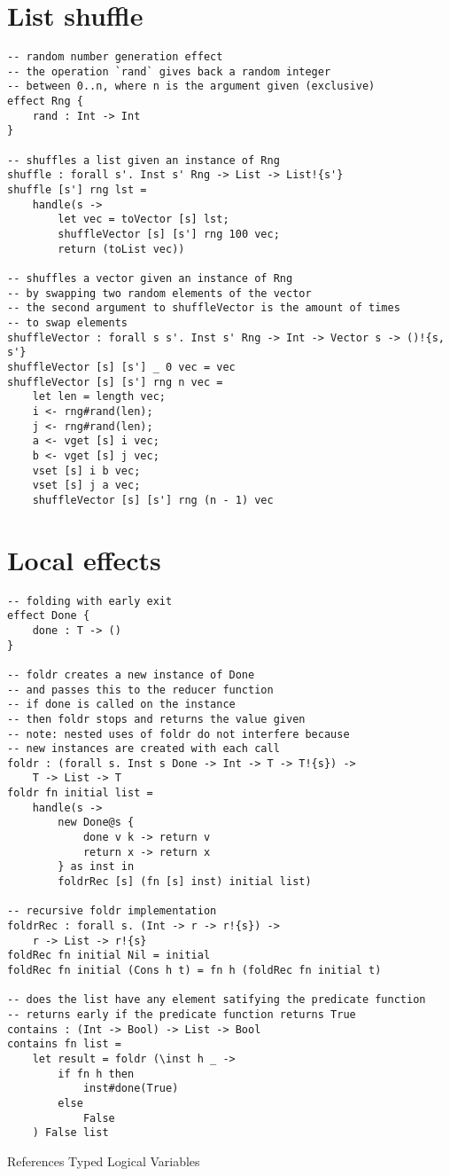 \section{List shuffle}
\begin{verbatim}
-- random number generation effect
-- the operation `rand` gives back a random integer
-- between 0..n, where n is the argument given (exclusive)
effect Rng {
	rand : Int -> Int
}

-- shuffles a list given an instance of Rng
shuffle : forall s'. Inst s' Rng -> List -> List!{s'}
shuffle [s'] rng lst =
	handle(s ->
		let vec = toVector [s] lst;
		shuffleVector [s] [s'] rng 100 vec;
		return (toList vec))

-- shuffles a vector given an instance of Rng
-- by swapping two random elements of the vector
-- the second argument to shuffleVector is the amount of times
-- to swap elements
shuffleVector : forall s s'. Inst s' Rng -> Int -> Vector s -> ()!{s, s'}
shuffleVector [s] [s'] _ 0 vec = vec
shuffleVector [s] [s'] rng n vec =
	let len = length vec;
	i <- rng#rand(len);
	j <- rng#rand(len);
	a <- vget [s] i vec;
	b <- vget [s] j vec;
	vset [s] i b vec;
	vset [s] j a vec;
	shuffleVector [s] [s'] rng (n - 1) vec
\end{verbatim}

\section{Local effects}
\begin{verbatim}
-- folding with early exit
effect Done {
	done : T -> ()
}

-- foldr creates a new instance of Done
-- and passes this to the reducer function
-- if done is called on the instance
-- then foldr stops and returns the value given
-- note: nested uses of foldr do not interfere because
-- new instances are created with each call
foldr : (forall s. Inst s Done -> Int -> T -> T!{s}) ->
	T -> List -> T
foldr fn initial list =
	handle(s ->
		new Done@s {
			done v k -> return v
			return x -> return x
		} as inst in
		foldrRec [s] (fn [s] inst) initial list)

-- recursive foldr implementation
foldrRec : forall s. (Int -> r -> r!{s}) ->
	r -> List -> r!{s}
foldRec fn initial Nil = initial
foldRec fn initial (Cons h t) = fn h (foldRec fn initial t)

-- does the list have any element satifying the predicate function
-- returns early if the predicate function returns True
contains : (Int -> Bool) -> List -> Bool
contains fn list =
	let result = foldr (\inst h _ ->
		if fn h then
			inst#done(True)
		else
			False
	) False list
\end{verbatim}

References Typed Logical Variables\cite{typedlogic}
